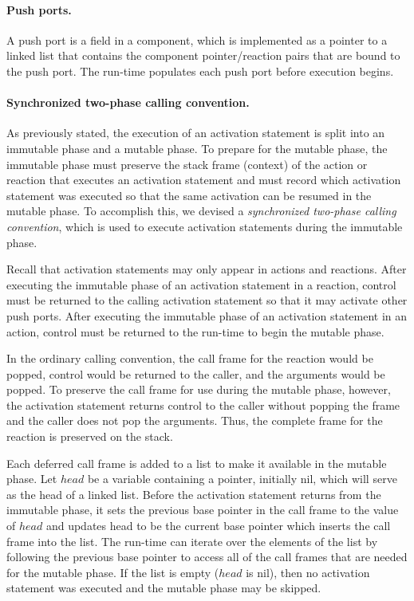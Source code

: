 \paragraph{Push ports.}
A push port is a field in a component, which is implemented as a pointer to a linked list that contains the component pointer/reaction pairs that are bound to the push port.
The run-time populates each push port before execution begins.

\paragraph{Synchronized two-phase calling convention.}
As previously stated, the execution of an activation statement is split into an immutable phase and a mutable phase.
To prepare for the mutable phase, the immutable phase must preserve the stack frame (context) of the action or reaction that executes an activation statement and must record which activation statement was executed so that the same activation can be resumed in the mutable phase.
To accomplish this, we devised a \emph{synchronized two-phase calling convention}, which is used to execute activation statements during the immutable phase.

Recall that activation statements may only appear in actions and reactions.
After executing the immutable phase of an activation statement in a reaction, control must be returned to the calling activation statement so that it may activate other push ports.
After executing the immutable phase of an activation statement in an action, control must be returned to the run-time to begin the mutable phase.

In the ordinary calling convention, the call frame for the reaction would be popped, control would be returned to the caller, and the arguments would be popped.
To preserve the call frame for use during the mutable phase, however, the activation statement returns control to the caller without popping the frame and the caller does not pop the arguments.
Thus, the complete frame for the reaction is preserved on the stack.

Each deferred call frame is added to a list to make it available in the mutable phase.
Let $head$ be a variable containing a pointer, initially nil, which will serve as the head of a linked list.
Before the activation statement returns from the immutable phase, it sets the previous base pointer in the call frame to the value of $head$ and updates head to be the current base pointer which inserts the call frame into the list.
The run-time can iterate over the elements of the list by following the previous base pointer to access all of the call frames that are needed for the mutable phase.
If the list is empty ($head$ is nil), then no activation statement was executed and the mutable phase may be skipped.

